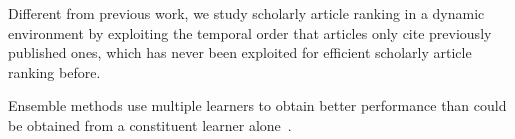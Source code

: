 Different from previous work, we study scholarly article ranking in a dynamic environment by exploiting the temporal order that articles only cite previously published ones, which has never been exploited for efficient scholarly article ranking before.



Ensemble methods use multiple learners to obtain better performance than could be obtained from a constituent learner alone~\cite{zhihua-book}. 
